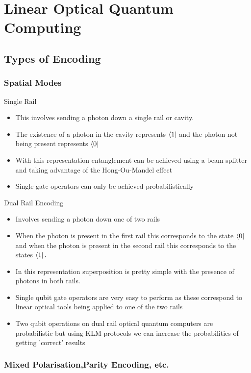 \section{Linear Optical Quantum Computing}
\subsection{Types of Encoding}
\subsubsection{Spatial Modes}
Single Rail
\begin{itemize}
    \item This involves sending a photon down a single rail or cavity.
    \item The existence of a photon in the cavity represents $\bra{1}$ and the photon not being present represents $\bra{0}$
    \item With this representation entanglement can be achieved using a beam splitter and taking advantage of the Hong-Ou-Mandel effect
    \item Single gate operators can only be achieved probabilistically
\end{itemize}
Dual Rail Encoding
\begin{itemize}
    \item Involves sending a photon down one of two rails
    \item When the photon is present in the first rail this corresponds to the state $\bra{0}$ and when the photon is present in the second rail this corresponds to the states $\bra{1}.$
    \item In this representation superposition is pretty simple with the presence of photons in both rails.
    \item Single qubit gate operators are very easy to perform as these correspond to linear optical tools being applied to one of the two rails
    \item Two qubit operations on dual rail optical quantum computers are probabilistic but using KLM protocols we can increase the probabilities of getting 'correct' results 
\end{itemize}
\subsubsection{Mixed Polarisation,Parity Encoding, etc.}


